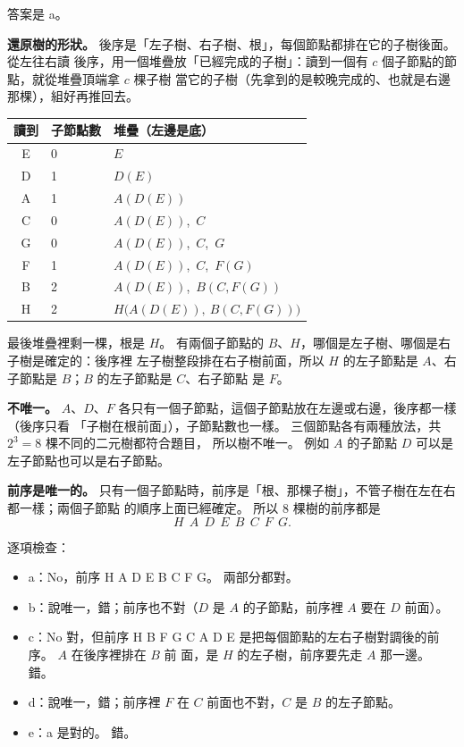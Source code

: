 \begin{pastsoln}
答案是 a。

\textbf{還原樹的形狀。} 後序是「左子樹、右子樹、根」，每個節點都排在它的子樹後面。 從左往右讀
後序，用一個堆疊放「已經完成的子樹」：讀到一個有 $c$ 個子節點的節點，就從堆疊頂端拿 $c$ 棵子樹
當它的子樹（先拿到的是較晚完成的、也就是右邊那棵），組好再推回去。
\begin{center}
\begin{tabular}{cll}
\toprule
讀到 & 子節點數 & 堆疊（左邊是底） \\
\midrule
E & 0 & $E$ \\
D & 1 & $D(E)$ \\
A & 1 & $A(D(E))$ \\
C & 0 & $A(D(E))$,\ $C$ \\
G & 0 & $A(D(E))$,\ $C$,\ $G$ \\
F & 1 & $A(D(E))$,\ $C$,\ $F(G)$ \\
B & 2 & $A(D(E))$,\ $B(C, F(G))$ \\
H & 2 & $H\bigl(A(D(E)),\ B(C, F(G))\bigr)$ \\
\bottomrule
\end{tabular}
\end{center}
最後堆疊裡剩一棵，根是 $H$。 有兩個子節點的 $B$、$H$，哪個是左子樹、哪個是右子樹是確定的：後序裡
左子樹整段排在右子樹前面，所以 $H$ 的左子節點是 $A$、右子節點是 $B$；$B$ 的左子節點是 $C$、右子節點
是 $F$。

\textbf{不唯一。} $A$、$D$、$F$ 各只有一個子節點，這個子節點放在左邊或右邊，後序都一樣（後序只看
「子樹在根前面」），子節點數也一樣。 三個節點各有兩種放法，共 $2^3 = 8$ 棵不同的二元樹都符合題目，
所以樹不唯一。 例如 $A$ 的子節點 $D$ 可以是左子節點也可以是右子節點。

\textbf{前序是唯一的。} 只有一個子節點時，前序是「根、那棵子樹」，不管子樹在左在右都一樣；兩個子節點
的順序上面已經確定。 所以 $8$ 棵樹的前序都是
\[
H\ \ A\ \ D\ \ E\ \ B\ \ C\ \ F\ \ G.
\]

逐項檢查：
\begin{itemize}
\item a：No，前序 H A D E B C F G。 兩部分都對。
\item b：說唯一，錯；前序也不對（$D$ 是 $A$ 的子節點，前序裡 $A$ 要在 $D$ 前面）。
\item c：No 對，但前序 H B F G C A D E 是把每個節點的左右子樹對調後的前序。 $A$ 在後序裡排在 $B$ 前
面，是 $H$ 的左子樹，前序要先走 $A$ 那一邊。 錯。
\item d：說唯一，錯；前序裡 $F$ 在 $C$ 前面也不對，$C$ 是 $B$ 的左子節點。
\item e：a 是對的。 錯。
\end{itemize}
\end{pastsoln}
